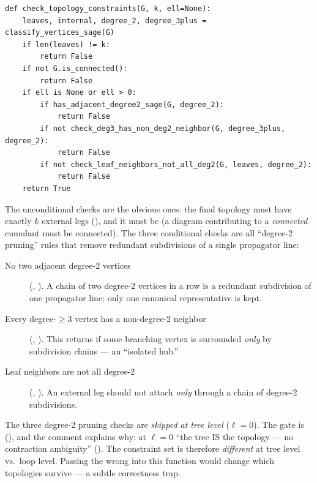 \begin{lstlisting}
def check_topology_constraints(G, k, ell=None):
    leaves, internal, degree_2, degree_3plus = classify_vertices_sage(G)
    if len(leaves) != k:
        return False
    if not G.is_connected():
        return False
    if ell is None or ell > 0:
        if has_adjacent_degree2_sage(G, degree_2):
            return False
        if not check_deg3_has_non_deg2_neighbor(G, degree_3plus, degree_2):
            return False
        if not check_leaf_neighbors_not_all_deg2(G, leaves, degree_2):
            return False
    return True
\end{lstlisting}

The unconditional checks are the obvious ones: the final topology must have
exactly $k$ external legs (), and it must be
 (a diagram contributing to a \emph{connected} cumulant must
be connected). The three conditional checks are all ``degree-2 pruning'' rules
that remove redundant subdivisions of a single propagator line:

\begin{description}
  \item[No two adjacent degree-2 vertices] (,
        ). A chain of two degree-2 vertices
        in a row is a redundant subdivision of one propagator line; only one
        canonical representative is kept.
  \item[Every degree-$\ge3$ vertex has a non-degree-2 neighbor]
        (,
        ). This returns  if
        some branching vertex is surrounded \emph{only} by subdivision chains ---
        an ``isolated hub.''
  \item[Leaf neighbors are not all degree-2]
        (,
        ). An external leg should not
        attach \emph{only} through a chain of degree-2 subdivisions.
\end{description}

\begin{gotcha}
\label{gotcha:ell0-skip}
The three degree-2 pruning checks are \emph{skipped at tree level} ($\ell=0$). The
gate is  (),
and the comment explains why: at $\ell=0$ ``the tree IS the topology --- no
contraction ambiguity'' (). The constraint
set is therefore \emph{different} at tree level vs.\ loop level. Passing the wrong
 into this function would change which topologies survive --- a subtle
correctness trap.
\end{gotcha}

